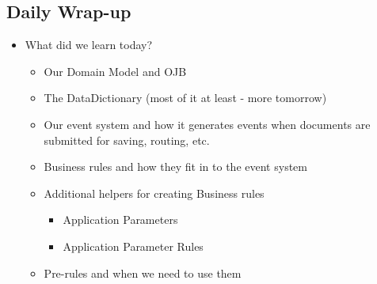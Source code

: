 \documentclass[12pt,notitlepage]{article}
\begin{document}
\begin{s5presentation}
\begin{s5slide}
\begin{ifhtml}
      \end{ifhtml} 
  \W \end{s5slide}
  \W \begin{s5slide}
      \W \section{Daily Wrap-up}
      \begin{ifhtml}
          \begin{itemize}
              \item What did we learn today?
              \begin{itemize}
                  \item Our Domain Model and OJB
                  \item The DataDictionary (most of it at least - more tomorrow)
                  \item Our event system and how it generates events when documents are submitted for saving, routing, etc.
                  \item Business rules and how they fit in to the event system
                  \item Additional helpers for creating Business rules
                  \begin{itemize}
                      \item Application Parameters
                      \item Application Parameter Rules
                  \end{itemize}
                  \item Pre-rules and when we need to use them
              \end{itemize}
          \end{itemize}
      \end{ifhtml} 
  \W \end{s5slide}
  \W \end{s5presentation}
\end{document}
